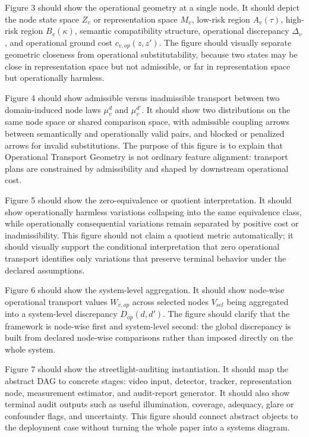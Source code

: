 \documentclass[11pt,a4paper]{article}
\begin{document}
Figure 3 should show the operational geometry at a single node. It should depict the node state space \(Z_v\) or representation space \(M_v\), low-risk region \(A_v(\tau)\), high-risk region \(B_v(\kappa)\), semantic compatibility structure, operational discrepancy \(\Delta_v\), and operational ground cost \(c_{v,op}(z,z')\). The figure should visually separate geometric closeness from operational substitutability, because two states may be close in representation space but not admissible, or far in representation space but operationally harmless.

Figure 4 should show admissible versus inadmissible transport between two domain-induced node laws \(\mu_v^d\) and \(\mu_v^{d'}\). It should show two distributions on the same node space or shared comparison space, with admissible coupling arrows between semantically and operationally valid pairs, and blocked or penalized arrows for invalid substitutions. The purpose of this figure is to explain that Operational Transport Geometry is not ordinary feature alignment: transport plans are constrained by admissibility and shaped by downstream operational cost.

Figure 5 should show the zero-equivalence or quotient interpretation. It should show operationally harmless variations collapsing into the same equivalence class, while operationally consequential variations remain separated by positive cost or inadmissibility. This figure should not claim a quotient metric automatically; it should visually support the conditional interpretation that zero operational transport identifies only variations that preserve terminal behavior under the declared assumptions.

Figure 6 should show the system-level aggregation. It should show node-wise operational transport values \(W_{v,op}\) across selected nodes \(V_{sel}\) being aggregated into a system-level discrepancy \(D_{op}(d,d')\). The figure should clarify that the framework is node-wise first and system-level second: the global discrepancy is built from declared node-wise comparisons rather than imposed directly on the whole system.

Figure 7 should show the streetlight-auditing instantiation. It should map the abstract DAG to concrete stages: video input, detector, tracker, representation node, measurement estimator, and audit-report generator. It should also show terminal audit outputs such as useful illumination, coverage, adequacy, glare or confounder flags, and uncertainty. This figure should connect abstract objects to the deployment case without turning the whole paper into a systems diagram.
\end{document}
